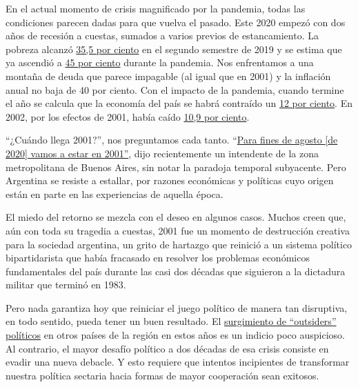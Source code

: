 En el actual momento de crisis magnificado por la pandemia, todas las
condiciones parecen dadas para que vuelva el pasado. Este 2020 empezó
con dos años de recesión a cuestas, sumados a varios previos de
estancamiento. La pobreza alcanzó
\href{https://www.clarin.com/economia/2019-termino-35-5-pobreza-8-indigencia_0__VnW6AFXG.html}{35,5
por ciento} en el segundo semestre de 2019 y se estima que ya ascendió a
\href{https://www.ambito.com/economia/pobreza/la-subio-7-puntos-la-pandemia-y-ya-se-ubica-el-45-segun-la-uca-n5114991}{45
por ciento} durante la pandemia. Nos enfrentamos a una montaña de deuda
que parece impagable (al igual que en 2001) y la inflación anual no baja
de 40 por ciento. Con el impacto de la pandemia, cuando termine el año
se calcula que la economía del país se habrá contraído un
\href{https://www.reuters.com/article/us-argentina-economy-poll/argentina-economy-to-shrink-12-in-2020-as-pandemic-batters-output-central-bank-poll-idUSKBN2442OY}{12
por ciento}. En 2002, por los efectos de 2001, había caído
\href{https://www.lanacion.com.ar/economia/el-pbi-cayo-109-por-ciento-durante-2002-nid482035/}{10,9
por ciento}.

``¿Cuándo llega 2001?'', nos preguntamos cada tanto.
``\href{https://www.batimes.com.ar/news/argentina/mario-ishii-by-late-august-well-be-where-we-were-in-2001.phtml}{Para
fines de agosto {[}de 2020{]} vamos a estar en 2001''}, dijo
recientemente un intendente de la zona metropolitana de Buenos Aires,
sin notar la paradoja temporal subyacente. Pero Argentina se resiste a
estallar, por razones económicas y políticas cuyo origen están en parte
en las experiencias de aquella época.

El miedo del retorno se mezcla con el deseo en algunos casos. Muchos
creen que, aún con toda su tragedia a cuestas, 2001 fue un momento de
destrucción creativa para la sociedad argentina, un grito de hartazgo
que reinició a un sistema político bipartidarista que había fracasado en
resolver los problemas económicos fundamentales del país durante las
casi dos décadas que siguieron a la dictadura militar que terminó en
1983.

Pero nada garantiza hoy que reiniciar el juego político de manera tan
disruptiva, en todo sentido, pueda tener un buen resultado. El
\href{https://www.nytimes.com/es/2019/02/01/espanol/opinion/crisis-partidos-politicos.html}{surgimiento
de ``outsiders'' políticos} en otros países de la región en estos años
es un indicio poco auspicioso. Al contrario, el mayor desafío político a
dos décadas de esa crisis consiste en evadir una nueva debacle. Y esto
requiere que intentos incipientes de transformar nuestra política
sectaria hacia formas de mayor cooperación sean exitosos.

